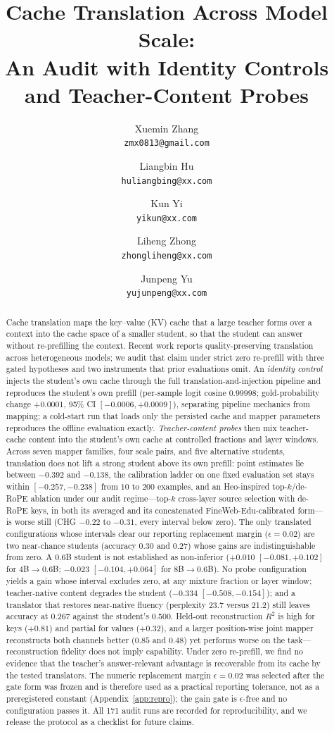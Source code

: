 \documentclass[10pt]{article}
\title{Cache Translation Across Model Scale:\\
An Audit with Identity Controls and Teacher-Content Probes}
\author[1]{Xuemin Zhang\\\texttt{\small zmx0813@gmail.com}}
\author[1]{Liangbin Hu\\\texttt{\small huliangbing@xx.com}}
\author[1]{Kun Yi\\\texttt{\small yikun@xx.com}}
\author[1]{Liheng Zhong\\\texttt{\small zhongliheng@xx.com}}
\author[1]{Junpeng Yu\\\texttt{\small yujunpeng@xx.com}}
\affil[1]{CETC}
\date{}
\begin{document}
\maketitle

\begin{abstract}
Cache translation maps the key--value (KV) cache that a large teacher forms
over a context into the cache space of a smaller student, so that the student
can answer without re-prefilling the context. Recent work reports
quality-preserving translation across heterogeneous models; we audit that claim
under strict zero re-prefill with three gated hypotheses and two instruments
that prior evaluations omit. An \emph{identity control} injects the student's
own cache through the full translation-and-injection pipeline and reproduces
the student's own prefill (per-sample logit cosine $0.99998$; gold-probability
change $+0.0001$, 95\% CI $[-0.0006, +0.0009]$), separating pipeline mechanics
from mapping; a cold-start run that loads only the persisted cache and mapper
parameters reproduces the offline evaluation exactly. \emph{Teacher-content probes} then mix teacher-cache content into the
student's own cache at controlled fractions and layer windows. Across seven
mapper families, four scale pairs, and five alternative students, translation
does not lift a strong student above its own
prefill: point estimates lie between $-0.392$ and $-0.138$, the calibration
ladder on one fixed evaluation set stays within $[-0.257, -0.238]$ from $10$ to
$200$ examples, and an Heo-inspired top-$k$/de-RoPE ablation under our audit regime---top-$k$ cross-layer source selection with
de-RoPE keys, in both its averaged and its concatenated FineWeb-Edu-calibrated form---is worse still (CHG $-0.22$ to $-0.31$, every interval below zero).
The only translated configurations whose intervals clear our reporting replacement margin ($\epsilon{=}0.02$) are two near-chance students (accuracy
$0.30$ and $0.27$) whose gains are indistinguishable from zero. A 0.6B student is not established as
non-inferior ($+0.010$ $[-0.081, +0.102]$ for 4B$\to$0.6B; $-0.023$
$[-0.104, +0.064]$ for 8B$\to$0.6B). No probe configuration yields a gain whose
interval excludes zero, at any mixture fraction or layer window; teacher-native
content degrades the student ($-0.334$ $[-0.508, -0.154]$); and a translator
that restores near-native fluency (perplexity 23.7 versus 21.2) still leaves
accuracy at 0.267 against the student's 0.500. Held-out reconstruction $R^2$ is
high for keys ($+0.81$) and partial for values ($+0.32$), and a larger
position-wise joint mapper reconstructs both channels better ($0.85$ and $0.48$)
yet performs worse on the task---reconstruction fidelity does not imply
capability. Under zero
re-prefill, we find no evidence that the teacher's answer-relevant advantage is
recoverable from its cache by the tested translators. The numeric replacement margin $\epsilon{=}0.02$ was selected after the gate form was frozen and is therefore used as a practical reporting tolerance, not as a preregistered constant (Appendix~\ref{app:repro}); the gain gate is $\epsilon$-free and no configuration passes it. All 171 audit runs are
recorded for reproducibility, and we release the protocol as a checklist for
future claims.
\end{abstract}
\end{document}
